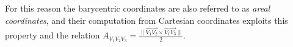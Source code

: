For this reason the barycentric coordinates are also referred to as \emph{areal coordinates}, and their computation from Cartesian coordinates exploits this property and the relation $A_{V_1V_2V_3} = \frac{\| \overrightarrow{V_1V_2} \times \overrightarrow{V_1V_3}  \|}{2}$.










% 
% 
% 
% 
% 
